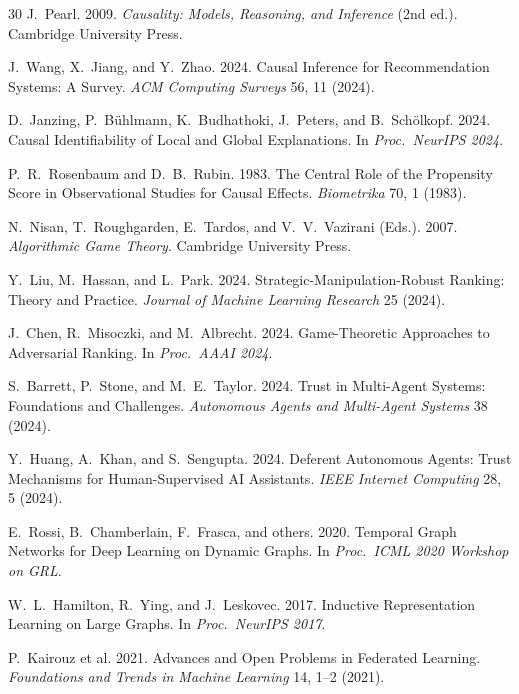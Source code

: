 \documentclass[sigconf,nonacm]{acmart}
\begin{document}
\begin{thebibliography}{30}
J.~Pearl. 2009. \textit{Causality: Models, Reasoning, and Inference}
(2nd ed.). Cambridge University Press.

J.~Wang, X.~Jiang, and Y.~Zhao. 2024. Causal Inference for
Recommendation Systems: A Survey.
\textit{ACM Computing Surveys} 56, 11 (2024).

D.~Janzing, P.~B\"uhlmann, K.~Budhathoki, J.~Peters, and
B.~Sch\"olkopf. 2024. Causal Identifiability of Local and Global
Explanations. In \textit{Proc.\ NeurIPS 2024}.

P.~R.~Rosenbaum and D.~B.~Rubin. 1983. The Central Role of the
Propensity Score in Observational Studies for Causal Effects.
\textit{Biometrika} 70, 1 (1983).

N.~Nisan, T.~Roughgarden, E.~Tardos, and V.~V.~Vazirani (Eds.).
2007. \textit{Algorithmic Game Theory}. Cambridge University Press.

Y.~Liu, M.~Hassan, and L.~Park. 2024. Strategic-Manipulation-Robust
Ranking: Theory and Practice. \textit{Journal of Machine Learning
Research} 25 (2024).

J.~Chen, R.~Misoczki, and M.~Albrecht. 2024. Game-Theoretic
Approaches to Adversarial Ranking. In \textit{Proc.\ AAAI 2024}.

S.~Barrett, P.~Stone, and M.~E.~Taylor. 2024. Trust in
Multi-Agent Systems: Foundations and Challenges.
\textit{Autonomous Agents and Multi-Agent Systems} 38 (2024).

Y.~Huang, A.~Khan, and S.~Sengupta. 2024. Deferent Autonomous
Agents: Trust Mechanisms for Human-Supervised AI Assistants.
\textit{IEEE Internet Computing} 28, 5 (2024).

E.~Rossi, B.~Chamberlain, F.~Frasca, and others. 2020. Temporal
Graph Networks for Deep Learning on Dynamic Graphs.
In \textit{Proc.\ ICML 2020 Workshop on GRL}.

W.~L.~Hamilton, R.~Ying, and J.~Leskovec. 2017. Inductive
Representation Learning on Large Graphs. In \textit{Proc.\ NeurIPS
2017}.

P.~Kairouz et al. 2021. Advances and Open Problems in Federated
Learning. \textit{Foundations and Trends in Machine Learning} 14,
1--2 (2021).


\end{thebibliography}
\end{document}
